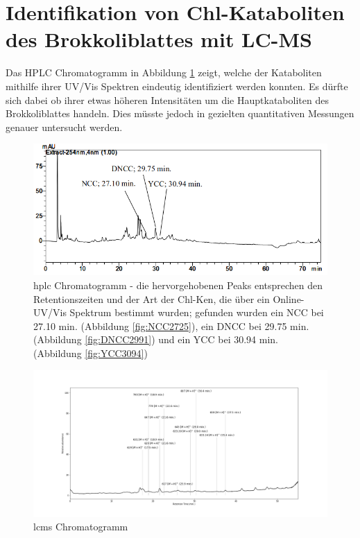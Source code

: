 \section{Identifikation von Chl-Kataboliten des Brokkoliblattes mit LC-MS} \label{sec:ChlKatabolitenBrokkoli}

Das HPLC Chromatogramm in Abbildung \ref{fig:HPLCChromatogramm} zeigt, welche der Kataboliten mithilfe ihrer UV/Vis Spektren eindeutig identifiziert werden konnten. Es dürfte sich dabei ob ihrer etwas höheren Intensitäten um die Hauptkataboliten des Brokkoliblattes handeln. Dies müsste jedoch in gezielten quantitativen Messungen genauer untersucht werden.

\begin{figure}[!htbp]
  \includegraphics[width=\textwidth]{figures/Kapitel6/keineReaktion/VWA_HPLC_Chromatogramm_keineReaktion.png}
  \caption[HPLC Chromatogramm vor der Reaktion, Quelle: Autor]{\gls{hplc} Chromatogramm - die hervorgehobenen Peaks entsprechen den Retentionszeiten und der Art der \gls{Chl-K}en, die über ein Online-UV/Vis Spektrum bestimmt wurden; gefunden wurden ein \gls{NCC} bei 27.10 min. (Abbildung \ref{fig:NCC2725}), ein DNCC bei 29.75 min. (Abbildung \ref{fig:DNCC2991}) und ein YCC bei 30.94 min. (Abbildung \ref{fig:YCC3094})}
  \label{fig:HPLCChromatogramm}
\end{figure}

\begin{figure}[!htbp]
  \centering
  \includegraphics[width=1.4\textwidth, center]{figures/Kapitel6/keineReaktion/Kuerbis_Analyse_keineReaktion2_Ganzes_Spektrum.png}
  \caption[LC-MS Chromatogramm vor der Reaktion, Quelle: Autor]{\gls{lcms} Chromatogramm}
  \label{fig:LCMSChromatogramm}
\end{figure}

